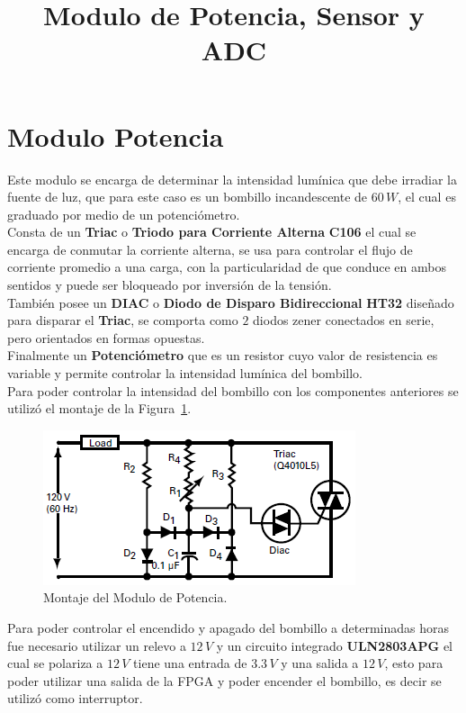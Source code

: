 \documentclass[12pt,graphicx,caption,rotating]{article}
\begin{document}
\title{Modulo de Potencia, Sensor y ADC}
\author{}
\date{}
\maketitle

\section{Modulo Potencia}
\noindent
Este modulo se encarga de determinar la intensidad lumínica que debe irradiar la fuente de luz, que para este caso es un bombillo incandescente de $60\, W$, el cual es graduado por medio de un potenciómetro.\\
Consta de un \textbf{Triac} o \textbf{Triodo para Corriente Alterna} \textbf{C106}\cite{c106} el cual se encarga de conmutar la corriente alterna, se usa para controlar el flujo de corriente promedio a una carga, con la particularidad de que conduce en ambos sentidos y puede ser bloqueado por inversión de la tensión.\\
También posee un \textbf{DIAC} o \textbf{Diodo de Disparo Bidireccional} \textbf{HT32}\cite{diac} diseñado para disparar el \textbf{Triac}, se comporta como $2$ diodos zener conectados en serie, pero orientados en formas opuestas.\\
Finalmente un \textbf{Potenciómetro} que es un resistor cuyo valor de resistencia es variable y permite controlar la intensidad lumínica del bombillo.\\
Para poder controlar la intensidad del bombillo con los componentes anteriores se utilizó el montaje de la Figura~\ref{fig1}.
\begin{figure}[H]
  \centering
    \includegraphics[scale=1]{Montaje_de_potencia.png}
      \caption{Montaje del Modulo de Potencia.}
	\label{fig1}
\end{figure}
\noindent
Para poder controlar el encendido y apagado del bombillo a determinadas horas fue necesario utilizar un relevo a $12\, V$ y un circuito integrado \textbf{ULN2803APG}\cite{uln} el cual se polariza a $12\, V$ tiene una entrada de $3.3\, V$ y una salida a $12\, V$, esto para poder utilizar una salida de la FPGA y poder encender el bombillo, es decir se utilizó como interruptor.
\end{document}
